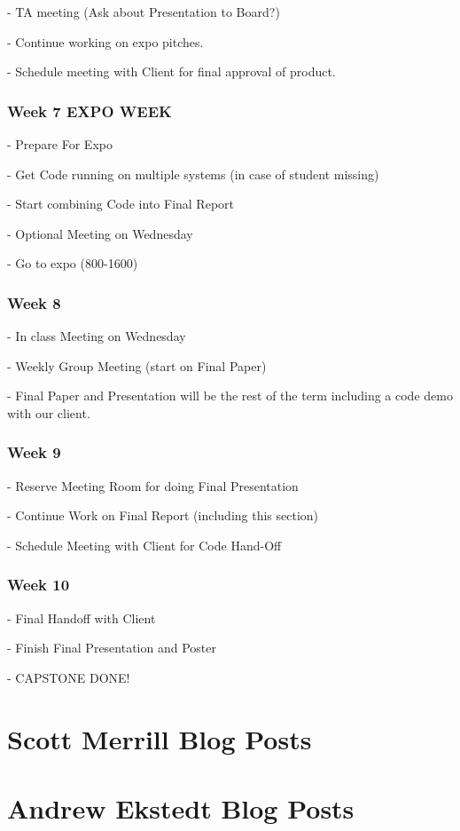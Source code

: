 - TA meeting (Ask about Presentation to Board?)

- Continue working on expo pitches.

- Schedule meeting with Client for final approval of product.

\subsubsection{Week 7 EXPO WEEK}
- Prepare For Expo

- Get Code running on multiple systems (in case of student missing)

- Start combining Code into Final Report

- Optional Meeting on Wednesday

- Go to expo (800-1600)
\subsubsection{Week 8}
- In class Meeting on Wednesday

- Weekly Group Meeting (start on Final Paper)

- Final Paper and Presentation will be the rest of the term including a code demo with our client.

\subsubsection{Week 9}
- Reserve Meeting Room for doing Final Presentation

- Continue Work on Final Report (including this section)

- Schedule Meeting with Client for Code Hand-Off

\subsubsection{Week 10}
- Final Handoff with Client

- Finish Final Presentation and Poster

- CAPSTONE DONE!

\section{ Scott Merrill Blog Posts }

\section{ Andrew Ekstedt Blog Posts }

